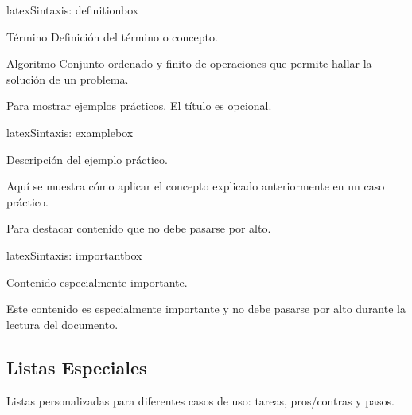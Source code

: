 \begin{codigosimple}{latex}{Sintaxis: definitionbox}
\begin{definitionbox}{Término}
  Definición del término o concepto.
\end{definitionbox}
\end{codigosimple}

\begin{definitionbox}{Algoritmo}
  Conjunto ordenado y finito de operaciones que permite hallar la
  solución de un problema.
\end{definitionbox}

Para mostrar ejemplos prácticos. El título es opcional.

\begin{codigosimple}{latex}{Sintaxis: examplebox}
\begin{examplebox}
  Descripción del ejemplo práctico.
\end{examplebox}
\end{codigosimple}

\begin{examplebox}
  Aquí se muestra cómo aplicar el concepto explicado anteriormente
  en un caso práctico.
\end{examplebox}

Para destacar contenido que no debe pasarse por alto.

\begin{codigosimple}{latex}{Sintaxis: importantbox}
\begin{importantbox}
  Contenido especialmente importante.
\end{importantbox}
\end{codigosimple}

\begin{importantbox}
  Este contenido es especialmente importante y no debe pasarse por alto
  durante la lectura del documento.
\end{importantbox}

\subsection{Listas Especiales}
\label{subsec:listas}

Listas personalizadas para diferentes casos de uso: tareas, pros/contras y pasos.

